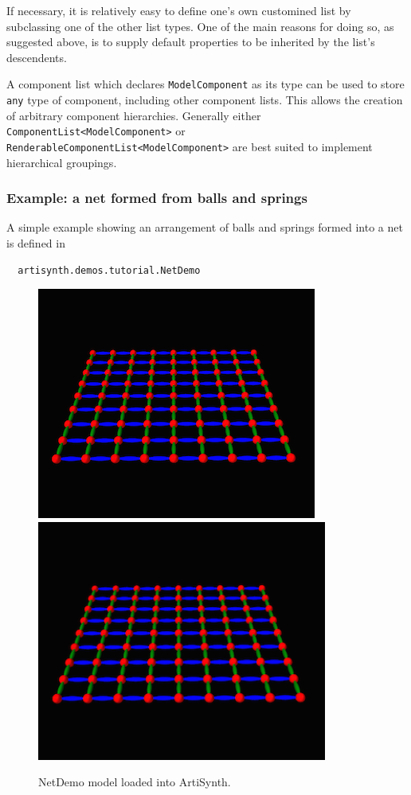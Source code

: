 If necessary, it is relatively easy to define one's own customined
list by subclassing one of the other list types. One of the main
reasons for doing so, as suggested above, is to supply default
properties to be inherited by the list's descendents.  

A component list which declares {\tt ModelComponent} as its type can
be used to store {\tt any} type of component, including other
component lists. This allows the creation of arbitrary component
hierarchies. Generally either\\
{\tt ComponentList<ModelComponent>} or 
{\tt RenderableComponentList<ModelComponent>} are
best suited to implement hierarchical groupings.

\subsubsection{Example: a net formed from balls and springs}

A simple example showing an arrangement of balls and springs formed into
a net is defined in
%
\begin{verbatim}
  artisynth.demos.tutorial.NetDemo
\end{verbatim}
%

\begin{figure}[ht]
\begin{center}
\iflatexml
 \includegraphics[]{images/NetDemo}
\else
 \includegraphics[width=3.75in]{images/NetDemo}
\fi
\end{center}
\caption{NetDemo model loaded into ArtiSynth.}
\label{NetDemo:fig}
\end{figure}

